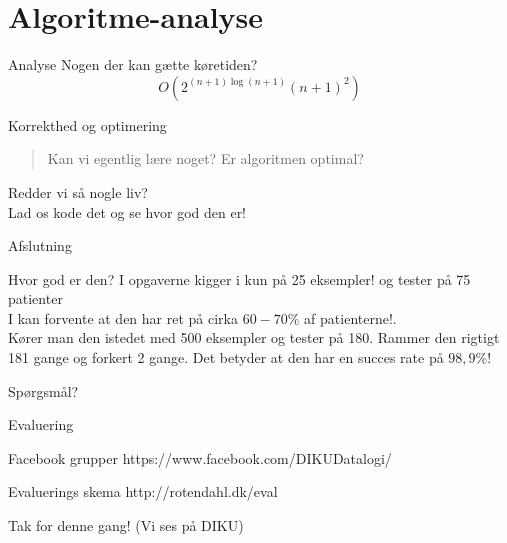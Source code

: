 \documentclass[12pt,t]{beamer}
\begin{document}
\section{Algoritme-analyse}
\frame{\tableofcontents[currentsection]}
\begin{frame}
        \begin{block}{Analyse}
            Nogen der kan gætte køretiden? \pause
            $$
                O(2^{(n+1) \log(n+1)} {(n + 1)}^{2})
            $$
        \end{block}
        \pause
        \begin{block}{Korrekthed og optimering}
            \begin{quote}
                Kan vi egentlig lære noget? \pause
                Er algoritmen optimal?
           \end{quote}

                \pause
                Redder vi så nogle liv? \\
                \pause
                \alert{Lad os kode det og se hvor god den er!}
        \end{block}
\end{frame}

    \begin{frame}[t]{Afslutning}
    \begin{block}{Hvor god er den? }
        I opgaverne kigger i kun på \alert{25 eksempler!} og tester på 75
        patienter \\
        \pause
        I kan forvente at den har ret på cirka $60-70\%$ af patienterne!.\\
        \pause
        Kører man den istedet med 500 eksempler og tester på 180. \pause
        Rammer den rigtigt 181 gange og forkert 2 gange. Det betyder at den
        har en succes rate på \alert{$98,9\%$!}
    \end{block}
    \pause
    \centering Spørgsmål?\\
    \end{frame}

    \begin{frame}[c]{Evaluering}
    \begin{block}{Facebook grupper}
        \centering
        https://www.facebook.com/DIKUDatalogi/ \\
    \end{block}
    \pause
    \begin{block}{Evaluerings skema}
        \centering
        http://rotendahl.dk/eval
    \end{block}
    \pause Tak for denne gang! (Vi ses på DIKU)
    \end{frame}
\end{document}

